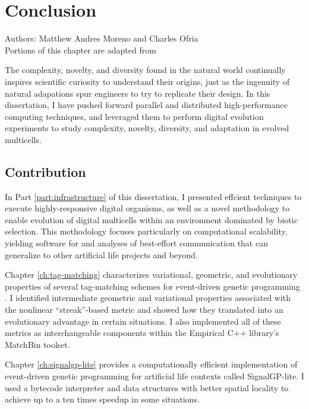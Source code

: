 \chapter{Conclusion}
\label{ch:conclusion}

\noindent
Authors: Matthew Andres Moreno and Charles Ofria \\
Portions of this chapter are adapted from ~\citep{moreno2020practical}

The complexity, novelty, and diversity found in the natural world continually inspires scientific curiosity to understand their origins, just as the ingenuity of natural adapations spur engineers to try to replicate their design.
In this dissertation, I have pushed forward parallel and distributed high-performance computing techniques, and leveraged them to perform digital evolution experiments to study complexity, novelty, diversity, and adaptation in evolved multicells.

\section{Contribution}

In Part \ref{part:infrastructure} of this dissertation, I presented effcient techniques to execute highly-responsive digital organisms, as well as a novel methodology to enable evolution of digital multicells within an environment dominated by biotic selection.
This methodology focuses particularly on computational scalability, yielding software for and analyses of best-effort communication that can generalize to other artificial life projects and beyond.

Chapter \ref{ch:tag-matching} characterizes variational, geometric, and evolutionary properties of several tag-matching schemes for event-driven genetic programming \citep{lalejini2018evolving}.
I identified intermediate geometric and variational properties associated with the nonlinear ``streak''-based metric \citep{downing2015intelligence} and showed how they translated into an evolutionary advantage in certain situations.
I also implemented all of these metrics as interchangeable components within the Empirical C++ library's MatchBin toolset.

Chapter \ref{ch:signalgp-lite} provides a computationally efficient implementation of event-driven genetic programming for artificial life contexts called SignalGP-lite.
I used a bytecode interpreter and data structures with better spatial locality to achieve up to a ten times speedup in some situations.

